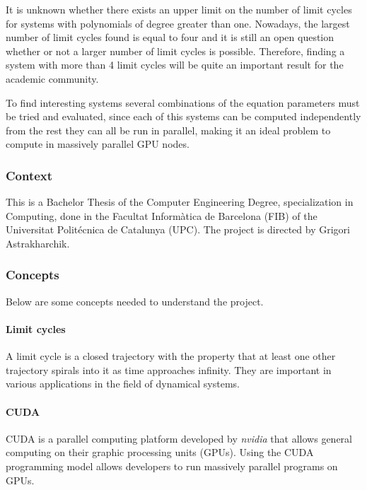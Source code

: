 \pagebreak
It is unknown whether there exists an upper limit on the number of limit cycles
for systems with polynomials of degree greater than
one\cite{ilyashenko_centennial_2002,llibre_sobre_2015}.  Nowadays, the
largest number of limit cycles found is equal to four and it is still an open
question whether or not a larger number of limit cycles is possible. Therefore,
finding a system with more than 4 limit cycles will be quite an important result
for the academic community.

To find interesting systems several combinations of the equation parameters
must be tried and evaluated, since each of this systems can be computed
independently from the rest they can all be run in parallel, making it an ideal
problem to compute in massively parallel GPU nodes.

\subsubsection{Context}

This is a Bachelor Thesis of the Computer Engineering Degree, specialization in
Computing, done in the \textcatalan{Facultat Inform\`atica de Barcelona (FIB)}
of the \textcatalan{Universitat Polit\'ecnica de Catalunya (UPC)}. The project
is directed by Grigori Astrakharchik.

\subsubsection{Concepts}

Below are some concepts needed to understand the project.

\paragraph{Limit cycles}

A limit cycle is a closed trajectory with the property that at least one other
trajectory spirals into it as time approaches infinity. They are important in
various applications in the field of dynamical systems.

\paragraph{CUDA}
CUDA is a parallel computing platform developed by \emph{nvidia} that allows general
computing on their graphic processing units (GPUs). Using the CUDA programming
model allows developers to run massively parallel programs on GPUs.

